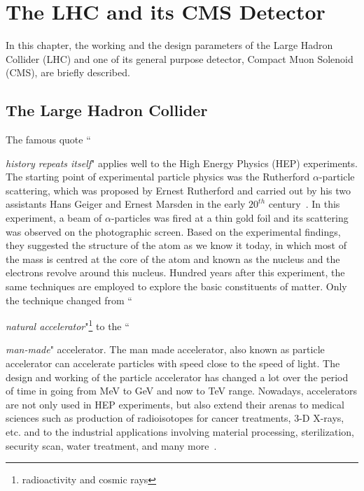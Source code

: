 \chapter{The LHC and its CMS Detector} %
\label{cha:the_lhc_and_cms_machine}

In this chapter, the working and the design parameters of the Large Hadron Collider (LHC) and one of its general purpose detector, Compact Muon Solenoid (CMS), are briefly described.


\section{The Large Hadron Collider} %
\label{sec:the_large_hadron_collider}

The famous quote ``{\textit{history repeats itself}" applies well to the High Energy Physics (HEP) experiments. The starting point of experimental particle physics was the Rutherford $\alpha$-particle scattering, which was proposed by Ernest Rutherford and carried out by his two assistants  Hans Geiger and Ernest Marsden in the early $20^{th}$ century~\cite{Hauptman2010}. In this experiment, a beam of $\alpha$-particles was fired at a thin gold foil and its scattering was observed on the photographic screen. Based on the experimental findings, they suggested the structure of the atom as we know it today, in which most of the mass is centred at the core of the atom and known as the nucleus and the electrons  revolve around this nucleus. Hundred years after this experiment, the same techniques are employed to explore the basic constituents of matter. Only the technique changed from ``{\textit{natural accelerator}"\footnote{radioactivity and cosmic rays} to the ``{\textit{man-made}" accelerator. The man made accelerator, also known as particle accelerator can accelerate particles with speed close to the speed of light. The design and working of the particle accelerator has changed a lot over the period of time in going from MeV to GeV and now to TeV range. Nowadays, accelerators are not only used in HEP experiments, but also extend their arenas to medical sciences such as production of radioisotopes for cancer treatments, 3-D X-rays, etc. and to the industrial applications involving material processing, sterilization, security scan, water treatment, and many more~\cite{Demarteau2016}. 

}}}
